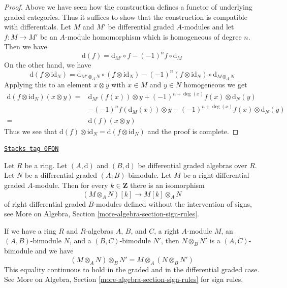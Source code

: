 \begin{proof}
Above we have seen how the construction defines a functor of underlying
graded categories. Thus it suffices to show that the construction is
compatible with differentials. Let $M$ and $M'$ be differential
graded $A$-modules and let $f : M \to M'$ be an $A$-module homomorphism
which is homogeneous of degree $n$. Then we have
$$
\text{d}(f) = \text{d}_{M'} \circ f - (-1)^n f \circ \text{d}_M
$$
On the other hand, we have
$$
\text{d}(f \otimes \text{id}_N) =
\text{d}_{M' \otimes_A N} \circ
(f \otimes \text{id}_N)
- (-1)^n
(f \otimes \text{id}_N) \circ \text{d}_{M \otimes_A N}
$$
Applying this to an element $x \otimes y$ with $x \in M$ and
$y \in N$ homogeneous we get
\begin{align*}
\text{d}(f \otimes \text{id}_N)(x \otimes y)
= &
\text{d}_{M'}(f(x)) \otimes y + (-1)^{n + \deg(x)}f(x) \otimes \text{d}_N(y) \\
& - (-1)^n f(\text{d}_M(x)) \otimes y
- (-1)^{n + \deg(x)}f(x) \otimes \text{d}_N(y) \\
= &
\text{d}(f) (x \otimes y)
\end{align*}
Thus we see that $\text{d}(f) \otimes \text{id}_N =
\text{d}(f \otimes \text{id}_N)$ and the proof is complete.
\end{proof}

\begin{remark}
\label{dga-remark-shift-tensor-no-sign}
\href{https://stacks.math.columbia.edu/tag/0FQN}{\texttt{Stacks tag 0FQN}}

Let $R$ be a ring. Let $(A, \text{d})$ and $(B, \text{d})$
be differential graded algebras over $R$. Let $N$ be a
differential graded $(A, B)$-bimodule. Let $M$ be a right differential
graded $A$-module. Then for every $k \in \mathbf{Z}$ there
is an isomorphism
$$
(M \otimes_A N)[k] \longrightarrow
M[k] \otimes_A N
$$
of right differential graded $B$-modules defined without the intervention
of signs, see More on Algebra, Section \ref{more-algebra-section-sign-rules}.
\end{remark}

If we have a ring $R$ and $R$-algebras $A$, $B$, and $C$,
a right $A$-module $M$, an $(A, B)$-bimodule $N$, and a
$(B, C)$-bimodule $N'$, then
$N \otimes_B N'$ is a $(A, C)$-bimodule and we have
$$
(M \otimes_A N) \otimes_B N' = M \otimes_A (N \otimes_B N')
$$
This equality continuous to hold in the graded and in the differential
graded case. See More on Algebra, Section \ref{more-algebra-section-sign-rules}
for sign rules.

